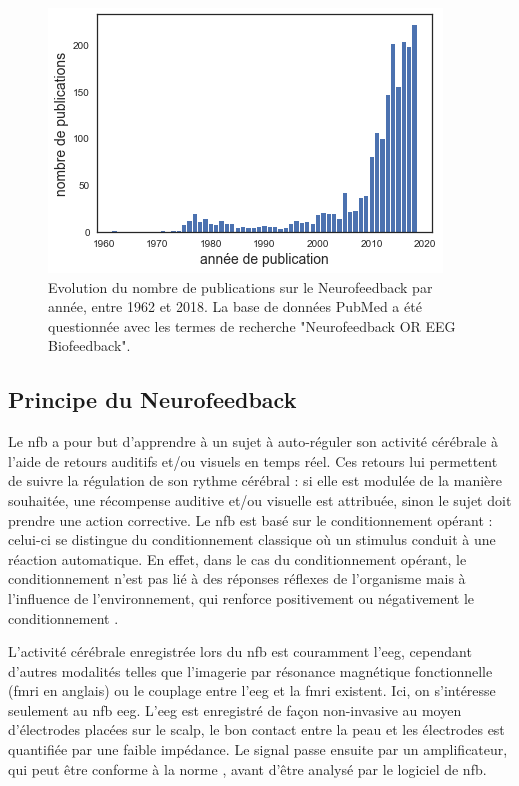 \begin{figure}[h!]
  \centering
	\includegraphics[width=0.7\linewidth]{figures/chapter-1/introduction-number-of-nfb-publications} 
  \caption{Evolution du nombre de publications sur le Neurofeedback par année, entre 1962 et 2018. La base de données PubMed a été questionnée avec les 
	termes de recherche "Neurofeedback OR EEG Biofeedback".}
  \label{Figure:introduction_number_of_nfb_publications}
\end{figure}

\subsection{Principe du Neurofeedback}

Le \gls{nfb} a pour but d'apprendre à un sujet à auto-réguler son activité cérébrale à l'aide de retours auditifs et/ou visuels en temps réel. 
Ces retours lui permettent de suivre la régulation de son rythme cérébral : si elle est modulée de la manière souhaitée, une récompense 
auditive et/ou visuelle est attribuée, sinon le sujet doit prendre une action corrective. Le \gls{nfb} est basé sur le conditionnement opérant 
\citep{Reynolds1975} : celui-ci se distingue du conditionnement classique où un stimulus conduit à une réaction automatique. 
En effet, dans le cas du conditionnement opérant, le conditionnement n'est pas lié à des réponses réflexes de
l'organisme mais à l'influence de l'environnement, qui renforce positivement ou négativement le conditionnement \citep{Skinner1948}. 

L'activité cérébrale enregistrée lors du \gls{nfb} est couramment l'\gls{eeg}, cependant d'autres modalités telles que l'imagerie par résonance 
magnétique fonctionnelle (\gls{fmri} en anglais) \citep{Sulzer2013} ou le couplage entre l'\gls{eeg} et la \gls{fmri} \citep{Perronnet2017} existent. Ici,
on s'intéresse seulement au \gls{nfb} \gls{eeg}. L'\gls{eeg} est enregistré de façon non-invasive au moyen d'électrodes placées sur le scalp, 
le bon contact entre la peau et les électrodes est quantifiée par une faible impédance. Le signal passe ensuite par un amplificateur, qui peut être
conforme à la norme \citep{ISO}, avant d'être analysé par le logiciel de \gls{nfb}. 

